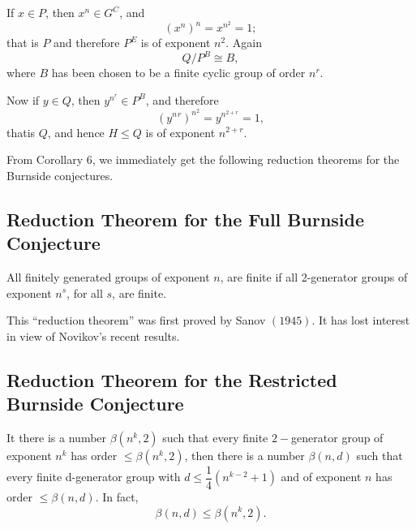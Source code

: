 If $x \in P$, then $x^n \in G^C$, and 
$$
(x^n)^n = x^{n^2} = 1;
$$
that is $P$ and therefore $P^E$ is of exponent $n^2$. Again
$$
Q/P^B \cong B,
$$
where $B$ has been chosen to be a finite cyclic group of order $n^r$. 

Now if $y \in Q$, then $y^{n^r} \in P^B$, and therefore
$$
(y^n{^r})^{n^2} = y^{n^{2+r}}= 1,
$$
that\pageoriginale is $Q$, and hence $H \leq Q$ is of exponent $n^{2+r}$.

From Corollary $6$, we immediately get the following reduction
theorems for the Burnside conjectures. 

\subsection{Reduction Theorem for the Full Burnside
  Conjecture}\label{chap8:sec2:subsec7}  %

All finitely generated groups of exponent $n$, are finite if all
2-generator groups of exponent $n^s$, for all $s$, are finite. 

This ``reduction theorem'' was first proved by Sanov $(1945)$. It has
lost interest in view of Novikov's recent results. 

\subsection{Reduction Theorem for the Restricted Burnside
  Conjecture}\label{chap8:sec2:subsec8} %

It there is a number $\beta (n^k, 2)$ such that every finite
$2-$generator group of exponent $n^k$ has order $\leq \beta (n^k,2)$,
then there is a number $\beta (n,d)$ such that every finite
d-generator group with $d \leq  \dfrac{1}{4} (n^{k-2} +1)$ and of
exponent $n$ has order $\leq \beta (n,d)$. In fact, 
$$
\beta (n,d) \leq \beta (n^k, 2).
$$
